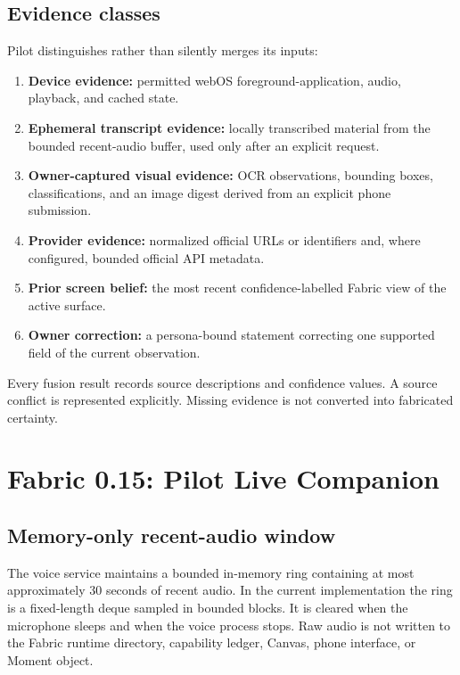 \documentclass[11pt,a4paper]{article}
\begin{document}
\subsection{Evidence classes}

Pilot distinguishes rather than silently merges its inputs:

\begin{enumerate}[leftmargin=*]
  \item \textbf{Device evidence:} permitted webOS foreground-application,
        audio, playback, and cached state.
  \item \textbf{Ephemeral transcript evidence:} locally transcribed material
        from the bounded recent-audio buffer, used only after an explicit
        request.
  \item \textbf{Owner-captured visual evidence:} OCR observations, bounding
        boxes, classifications, and an image digest derived from an explicit
        phone submission.
  \item \textbf{Provider evidence:} normalized official URLs or identifiers
        and, where configured, bounded official API metadata.
  \item \textbf{Prior screen belief:} the most recent confidence-labelled
        Fabric view of the active surface.
  \item \textbf{Owner correction:} a persona-bound statement correcting one
        supported field of the current observation.
\end{enumerate}

Every fusion result records source descriptions and confidence values.  A
source conflict is represented explicitly.  Missing evidence is not converted
into fabricated certainty.

\section{Fabric 0.15: Pilot Live Companion}

\subsection{Memory-only recent-audio window}

The voice service maintains a bounded in-memory ring containing at most
approximately 30 seconds of recent audio.  In the current implementation the
ring is a fixed-length deque sampled in bounded blocks.  It is cleared when the
microphone sleeps and when the voice process stops.  Raw audio is not written
to the Fabric runtime directory, capability ledger, Canvas, phone interface,
or Moment object.
\end{document}
